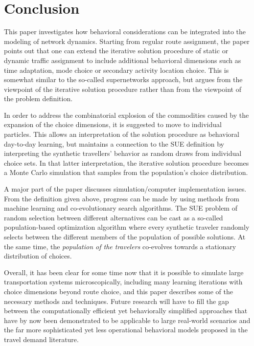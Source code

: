 \section{Conclusion}
\label{sec:conclusion}

This paper investigates how behavioral considerations can be
integrated into the modeling of network dynamics.  Starting from
regular route assignment, the paper points out that one can extend the
iterative solution procedure of static or dynamic traffic assignment
to include additional behavioral dimensions such as time adaptation,
mode choice or secondary activity location choice.  This is somewhat
similar to the so-called supernetworks approach, but argues from the
viewpoint of the iterative solution procedure rather than from the
viewpoint of the problem definition.

In order to address the combinatorial explosion of the commodities
caused by the expansion of the choice dimensions, it is suggested to
move to individual particles.  This allows an interpretation of the
solution procedure as behavioral day-to-day learning, but maintains a
connection to the SUE definition by interpreting the synthetic
travellers' behavior as random draws from individual choice sets.  In
that latter interpretation, the iterative solution procedure becomes a
Monte Carlo simulation that samples from the population's choice
distribution.

A major part of the paper discusses simulation/computer implementation issues.
From the definition given above, progress can be made by using methods
from machine learning and co-evolutionary search algorithms.  
%
The SUE problem of random selection between different alternatives can
be cast as a so-called population-based optimization algorithm where
every synthetic traveler randomly selects between the different
members of the population of possible solutions.
%
At the same time, the \emph{population of the travelers} co-evolves
towards a stationary distribution of choices.


Overall, it has been clear for some time now that it is possible to
simulate large transportation systems microscopically, including many
learning iterations with choice dimensions beyond route choice, and
this paper describes some of the necessary methods and techniques.
%
Future research will have to fill the gap between the computationally
efficient yet behaviorally simplified approaches that have by now been
demonstrated to be applicable to large real-world scenarios and the
far more sophisticated yet less operational behavioral models proposed 
in the travel demand literature.

